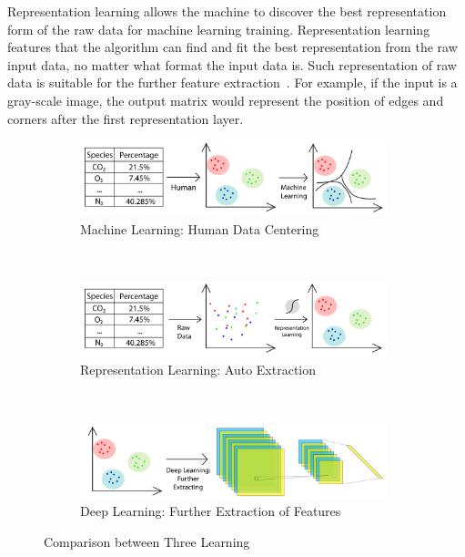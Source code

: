 \begin{spacing}{1.5}
Representation learning allows the machine to discover the best representation form of the raw data for machine learning training. Representation learning features that the algorithm can find and fit the best representation from the raw input data, no matter what format the input data is. Such representation of raw data is suitable for the further feature extraction~\cite{bengio2013representation}. For example, if the input is a gray-scale image, the output matrix would represent the position of edges and corners after the first representation layer.

\begin{figure}[th]
    \centering
    \begin{subfigure}[b]{0.99\textwidth}
        \centering
        \includegraphics[width=0.98\textwidth, fbox]{Chapter2/Machine-Learing.pdf}
        \caption{Machine Learning: Human Data Centering}
        \label{fig:mldiagram} 
    \end{subfigure}%
    \\
    \begin{subfigure}[b]{0.99\textwidth}
        \centering
        \includegraphics[width=0.98\textwidth, fbox]{Chapter2/Represent-Learing.pdf}
        \caption{Representation Learning: Auto Extraction}
        \label{fig:representdiagram} 
    \end{subfigure}
    \\
    \begin{subfigure}[b]{0.99\textwidth}
        \centering
        \includegraphics[width=0.98\textwidth, fbox]{Chapter2/Deep-Learing.pdf}
        \caption{Deep Learning: Further Extraction of Features}
        \label{fig:dldiagram} 
    \end{subfigure}%
    \caption{Comparison between Three Learning}
\end{figure}


\end{spacing}
